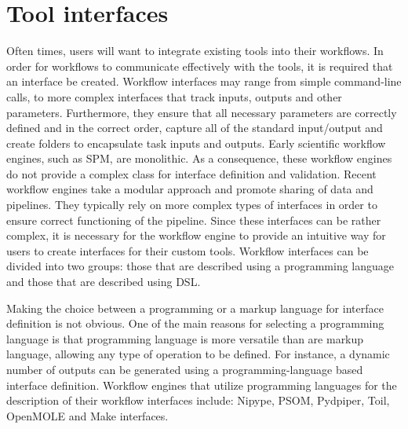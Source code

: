 \documentclass{report}
\begin{document}
        \section{Tool interfaces}\label{mod}
            Often times, users will want to integrate existing tools into their 
            workflows. In order for workflows to communicate effectively with
            the tools, it is required that an interface be created. Workflow 
            interfaces may range from simple command-line calls, to more 
            complex interfaces that track inputs, outputs and other parameters. 
            Furthermore, they ensure
            that all necessary parameters are correctly defined and in the 
            correct order,  capture all of the 
            standard input/output and create folders to encapsulate task inputs
            and outputs. Early scientific workflow engines, such as SPM, are 
            monolithic. As a consequence, these workflow engines do not provide
            a complex class for interface definition and validation. Recent
            workflow engines take a modular approach and promote sharing of data
            and pipelines. They typically rely on more complex types 
            of interfaces in order to ensure correct functioning of the pipeline.
            Since these interfaces can be rather complex, it is necessary for the 
            workflow engine to provide an intuitive way for users to create 
            interfaces for their custom tools. Workflow interfaces can be 
            divided into two groups: those that are described using a 
            programming language and those that are described using DSL.

            Making the choice between a programming or a markup language for 
            interface definition is not obvious. One of the main reasons for 
            selecting a programming language is that programming language is 
            more versatile than are markup language, allowing any type of 
            operation to be defined. For instance, a dynamic number of outputs
            can be generated using a programming-language based interface 
            definition. Workflow engines that utilize programming 
            languages for the 
            description of their workflow interfaces include: Nipype, PSOM,
            Pydpiper, Toil, OpenMOLE and Make interfaces. 
          
\end{document}
